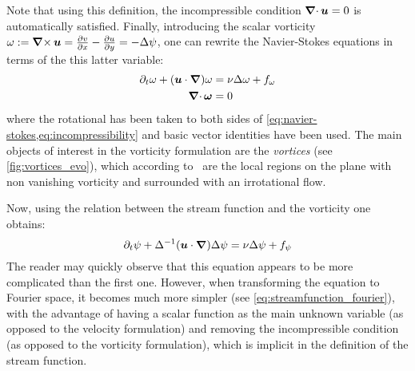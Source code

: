 \documentclass[../main.tex]{subfiles}
\begin{document}
Note that using this definition, the incompressible condition $\operatorname{\boldsymbol{\nabla}\cdot} \boldsymbol{u}=0$ is automatically satisfied. Finally, introducing the scalar vorticity $\omega := \operatorname{\boldsymbol{\nabla}\times} \boldsymbol{u} = \pdv{v}{x} - \pdv{u}{y}=-\Delta \psi$, one can rewrite the Navier-Stokes equations in terms of the this latter variable:
\begin{align}
	\partial_t \omega + (\boldsymbol{u} \cdot \grad) \omega & = \nu \Delta \omega + f_\omega \\
	\operatorname{\boldsymbol{\nabla}\cdot}{\boldsymbol{\omega}}                              & = 0
\end{align}
where the rotational has been taken to both sides of \cref{eq:navier-stokes,eq:incompressibility} and basic vector identities have been used. The main objects of interest in the vorticity formulation are the \emph{vortices} (see \cref{fig:vortices_evo}), which according to~\cite{Saffman} are the local regions on the plane with non vanishing vorticity and surrounded with an irrotational flow.

Now, using the relation between the stream function and the vorticity one obtains:
\begin{equation}\label{eq:streamfunction}
	\partial_t \psi + \Delta^{-1} (\boldsymbol{u} \cdot \grad) \Delta \psi = \nu \Delta \psi + f_\psi
\end{equation}
The reader may quickly observe that this equation appears to be more complicated than the first one. However, when transforming the equation to Fourier space, it becomes much more simpler (see \cref{eq:streamfunction_fourier}), with the advantage of having a scalar function as the main unknown variable (as opposed to the velocity formulation) and removing the incompressible condition (as opposed to the vorticity formulation), which is implicit in the definition of the stream function.
\end{document}
